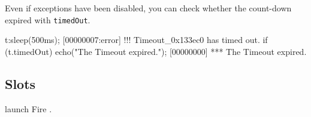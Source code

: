 Even if exceptions have been disabled, you can check whether the
count-down expired with \lstinline|timedOut|.

\begin{urbiscript}
t:sleep(500ms);
[00000007:error] !!! Timeout_0x133ec0 has timed out.
if (t.timedOut)
  echo("The Timeout expired.");
[00000000] *** The Timeout expired.
\end{urbiscript}

\subsection{Slots}
\begin{urbiscriptapi}
\item[launch]
  Fire \this.

\end{urbiscriptapi}

